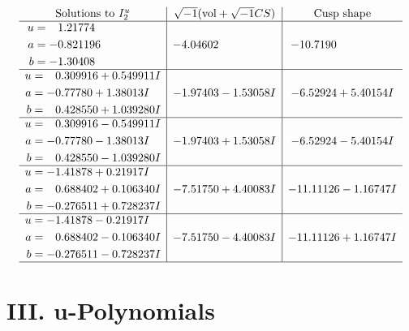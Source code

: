 \documentclass[1p]{elsarticle_modified}
\theoremstyle{definition}
\newcommand{\I}{\sqrt{-1}}
\begin{document}
$$\begin{array}{c|c|c}  
\text{Solutions to }I^u_{2}& \I (\text{vol} + \sqrt{-1}CS) & \text{Cusp shape}\\
 \hline 
\begin{aligned}
u &= \phantom{-}1.21774\phantom{ +0.000000I} \\
a &= -0.821196\phantom{ +0.000000I} \\
b &= -1.30408\phantom{ +0.000000I}\end{aligned}
 & -4.04602\phantom{ +0.000000I} & -10.7190\phantom{ +0.000000I} \\ \hline\begin{aligned}
u &= \phantom{-}0.309916 + 0.549911 I \\
a &= -0.77780 + 1.38013 I \\
b &= \phantom{-}0.428550 + 1.039280 I\end{aligned}
 & -1.97403 - 1.53058 I & -6.52924 + 5.40154 I \\ \hline\begin{aligned}
u &= \phantom{-}0.309916 - 0.549911 I \\
a &= -0.77780 - 1.38013 I \\
b &= \phantom{-}0.428550 - 1.039280 I\end{aligned}
 & -1.97403 + 1.53058 I & -6.52924 - 5.40154 I \\ \hline\begin{aligned}
u &= -1.41878 + 0.21917 I \\
a &= \phantom{-}0.688402 + 0.106340 I \\
b &= -0.276511 + 0.728237 I\end{aligned}
 & -7.51750 + 4.40083 I & -11.11126 - 1.16747 I \\ \hline\begin{aligned}
u &= -1.41878 - 0.21917 I \\
a &= \phantom{-}0.688402 - 0.106340 I \\
b &= -0.276511 - 0.728237 I\end{aligned}
 & -7.51750 - 4.40083 I & -11.11126 + 1.16747 I\\
 \hline 
 \end{array}$$\newpage
\newpage\renewcommand{\arraystretch}{1}
\centering \section*{ III. u-Polynomials}
\end{document}
